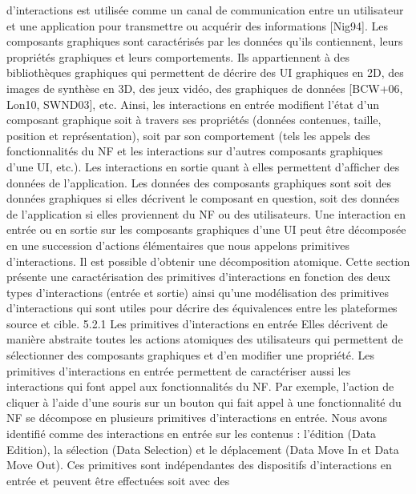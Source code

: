 \documentclass{article}
\begin{document}
d’interactions est utilis\'{e}e comme un canal de communication entre un utilisateur et une application
pour transmettre ou acqu\'{e}rir des informations [Nig94].
Les composants graphiques sont caract\'{e}ris\'{e}s par les donn\'{e}es qu’ils contiennent, leurs propri\'{e}t\'{e}s
graphiques et leurs comportements. Ils appartiennent \`{a} des biblioth\`{e}ques graphiques qui permettent
de d\'{e}crire des UI graphiques en 2D, des images de synth\`{e}se en 3D, des jeux vid\'{e}o, des graphiques
de donn\'{e}es [BCW+06, Lon10, SWND03], etc. Ainsi, les interactions en entr\'{e}e modiﬁent l’\'{e}tat d’un
composant graphique soit \`{a} travers ses propri\'{e}t\'{e}s (donn\'{e}es contenues, taille, position et repr\'{e}sentation), soit par son comportement (tels les appels des fonctionnalit\'{e}s du NF et les interactions sur
d’autres composants graphiques d’une UI, etc.). Les interactions en sortie quant \`{a} elles permettent
d’afﬁcher des donn\'{e}es de l’application. Les donn\'{e}es des composants graphiques sont soit des donn\'{e}es graphiques si elles d\'{e}crivent le composant en question, soit des donn\'{e}es de l’application si
elles proviennent du NF ou des utilisateurs.
Une interaction en entr\'{e}e ou en sortie sur les composants graphiques d’une UI peut \^{e}tre d\'{e}compos\'{e}e en une succession d’actions \'{e}l\'{e}mentaires que nous appelons primitives d’interactions. Il est possible d’obtenir une d\'{e}composition atomique. Cette section pr\'{e}sente une caract\'{e}risation des primitives
d’interactions en fonction des deux types d’interactions (entr\'{e}e et sortie) ainsi qu’une mod\'{e}lisation
des primitives d’interactions qui sont utiles pour d\'{e}crire des \'{e}quivalences entre les plateformes source
et cible.
5.2.1
Les primitives d’interactions en entr\'{e}e
Elles d\'{e}crivent de mani\`{e}re abstraite toutes les actions atomiques des utilisateurs qui permettent de
s\'{e}lectionner des composants graphiques et d’en modiﬁer une propri\'{e}t\'{e}. Les primitives d’interactions
en entr\'{e}e permettent de caract\'{e}riser aussi les interactions qui font appel aux fonctionnalit\'{e}s du NF.
Par exemple, l’action de cliquer \`{a} l’aide d’une souris sur un bouton qui fait appel \`{a} une fonctionnalit\'{e}
du NF se d\'{e}compose en plusieurs primitives d’interactions en entr\'{e}e.
Nous avons identiﬁ\'{e} comme des interactions en entr\'{e}e sur les contenus : l’\'{e}dition (Data Edition),
la s\'{e}lection (Data Selection) et le d\'{e}placement (Data Move In et Data Move Out). Ces primitives
sont ind\'{e}pendantes des dispositifs d’interactions en entr\'{e}e et peuvent \^{e}tre effectu\'{e}es soit avec des
\end{document}
